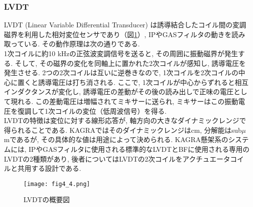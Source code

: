 \subsubsection{LVDT}
\vskip3mm
LVDT (Linear Variable Differential Transducer) は誘導結合したコイル間の変調磁界を利用した相対変位センサであり\cite{36}（図\ref{fig4.4}）, IPやGASフィルタの動きを読み取っている. その動作原理は次の通りである. \\
\quad 1次コイルに約10 kHzの正弦波変調信号を送ると, その周囲に振動磁界が発生する. そして, その磁界の変化を同軸上に置かれた2次コイルが感知し, 誘導電圧を発生させる. 2つの2次コイルは互いに逆巻きなので, 1次コイルを2次コイルの中心に置くと誘導電圧は打ち消される. ここで, 1次コイルが中心からずれると相互インダクタンスが変化し, 誘導電圧の差動がその後の読み出しで正味の電圧として現れる. この差動電圧は増幅されてミキサーに送られ, ミキサーはこの振動電圧を復調して1次コイルの変位（低周波信号）を得る. \\
\quad LVDTの特徴は変位に対する線形応答が, 軸方向の大きなダイナミックレンジで得られることである. KAGRAではそのダイナミックレンジはcm, 分解能はsub$\mu$mであるが, その具体的な値は用途によって決められる. KAGRA懸架系のシステムには, IPやGASフィルタに使用される標準的なLVDTとBFに使用される専用のLVDTの2種類があり, 後者についてはLVDTの2次コイルをアクチュエータコイルと共用する設計である. 
\begin{figure}[H]
\begin{center}
\texttt{[image: fig4\_4.png]}
\caption[LVDTの概要図]{LVDTの概要図}
\label{fig4.4}
\end{center}
\end{figure}

